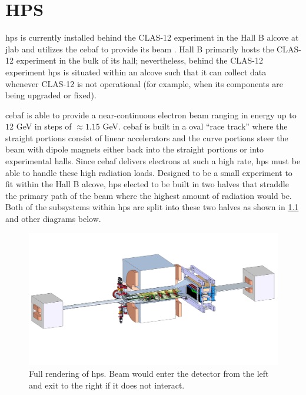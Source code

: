 \chapter{HPS}
\label{chapter:hps:experiment}
\ac{hps} is currently installed behind the CLAS-12 experiment in the Hall B
alcove at \ac{jlab} and utilizes the \ac{cebaf} to provide its beam
\cite{mrsolt-thesis-2020,skmccarty-thesis-2020}.
Hall B primarily hosts the CLAS-12 experiment 
in the bulk of its hall; nevertheless, behind the CLAS-12 experiment \ac{hps} is situated
within an alcove such that it can collect data whenever CLAS-12 is not operational (for example,
when its components are being upgraded or fixed).

\ac{cebaf} \cite{cebaf-12GeV-2012,cebaf-opportunities-2012,cebaf-2013} is able to
provide a near-continuous electron beam ranging in energy up to $12$ GeV in steps
of $\approx 1.15$ GeV. \ac{cebaf} is built in a oval ``race track'' where the straight
portions consist of linear accelerators and the curve portions steer the beam with
dipole magnets either back into the straight portions or into experimental halls.
Since \ac{cebaf} delivers electrons at such a high rate, \ac{hps} must be able to
handle these high radiation loads. Designed to be a small experiment to fit within
the Hall B alcove, \ac{hps} elected to be built in two halves that straddle the primary
path of the beam where the highest amount of radiation would be. Both of the subsystems
within \ac{hps} are split into these two halves as shown in \cref{fig:hps-full-render}
and other diagrams below.

\begin{figure}
    \centering
    \includegraphics[trim={15cm 10cm 10cm 5cm},clip,width=\textwidth]{figures/hps/experiment/hps_full_render.jpg}
    \caption{
        Full rendering of \ac{hps}.
        Beam would enter the detector from the left and exit to the right if it does not interact.
    }
    \label{fig:hps-full-render}
\end{figure}

